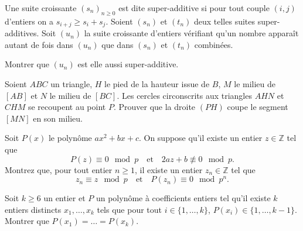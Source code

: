 \begin{exo}{}
\begin{center}
\end{center}
\end{exo}



\begin{exo}{}
Une suite croissante $(s_n) _ { n \geq 0}$ est dite super-additive si pour tout couple $(i,j)$ d'entiers on a $s_{i+j} \geq s_i + s_j$. Soient $(s_n)$ et $(t_n)$ deux telles suites super-additives. Soit $(u_n)$ la suite croissante d'entiers vérifiant qu'un nombre apparaît autant de fois dans $(u_n)$ que dans $(s_n)$ et $(t_n)$ combinées. 

Montrer que $(u_n)$ est elle aussi super-additive.
\end{exo}

\begin{exo}{}Soient $ABC$ un triangle, $H$ le pied de la hauteur issue de $B$, $M$  le milieu de $[AB]$ et $N$ le milieu de $[BC]$. Les cercles circonscrits aux triangles $AHN$ et $CHM$ se recoupent au point $P$. Prouver que la droite $(PH)$ coupe le segment $[MN]$ en son milieu.
\end{exo}

\begin{exo}{}
Soit $P(x)$ le polyn\^ome $ax^2+bx+c$. On suppose qu'il existe un entier $z\in\mathbb{Z}$ tel que
\[P(z)\equiv 0\mod p\quad\text{et}\quad 2az+b\not\equiv 0\mod p.\]
Montrez que, pour tout entier $n\geq 1$, il existe un entier $z_n\in\mathbb{Z}$ tel que
\[z_n\equiv z\mod p\quad\text{et}\quad P(z_n)\equiv 0\mod p^n.\]
\end{exo}

\begin{exo}{} Soit $k\geq 6$ un entier  et $P$ un polynôme à coefficients entiers tel qu'il existe $k$ entiers distincts $x_1,\ldots,x_k$ tels que pour tout $i\in \{1,\ldots,k\}$, $P(x_i) \in \{1,\ldots,k-1\}$. Montrer que $P(x_1) = \ldots = P(x_k)$. 
\end{exo}

